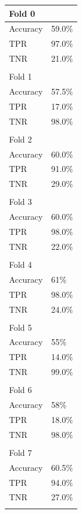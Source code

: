 \documentclass[template.tex]{subfiles}
\begin{document}
\begin{table}[H]
	\centering
    \begin{tabular}{ll}
    Fold 0 \\ \hline
    Accuracy &  59.0\% \\
	TPR &  97.0\% \\
	TNR &  21.0\% \\ \\
	
	Fold 1 \\ \hline
    Accuracy &  57.5\% \\
	TPR &  17.0\% \\
	TNR &  98.0\% \\ \\
	
	Fold 2 \\ \hline
    Accuracy &  60.0\% \\
	TPR &  91.0\% \\
	TNR &  29.0\% \\ \\
	
	Fold 3 \\ \hline
    Accuracy &  60.0\% \\
	TPR &  98.0\% \\
	TNR &  22.0\% \\ \\
	
	Fold 4 \\ \hline
    Accuracy &  61\% \\
	TPR &  98.0\% \\
	TNR &  24.0\% \\ \\
	
	Fold 5 \\ \hline
    Accuracy &  55\% \\
	TPR & 14.0\% \\
	TNR &  99.0\% \\ \\
	
	Fold 6 \\ \hline
    Accuracy &  58\% \\
	TPR &  18.0\% \\
	TNR &  98.0\% \\ \\
	
	Fold 7 \\ \hline
    Accuracy &  60.5\% \\
	TPR &  94.0\% \\
	TNR &  27.0\% \\ \\
	

\end{tabular}
\end{table}
\end{document}
